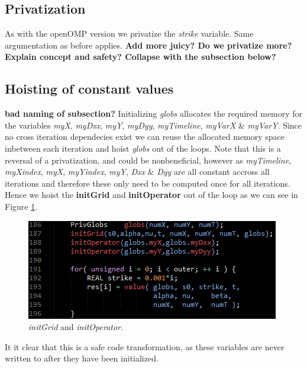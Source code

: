 \subsection{Privatization}
As with the openOMP version we privatize the \emph{strike} variable. Same
argumentation as before applies.
\textbf{Add more juicy? Do we privatize more? Explain concept and safety? Collapse with the subsection below?}

\subsection{Hoisting of constant values}
\textbf{bad naming of subsection?}
Initializing \emph{globs} allocates the required memory for the variables
\emph{myX}, \emph{myDxx}, \emph{myY}, \emph{myDyy}, \emph{myTimeline},
\emph{myVarX} \& \emph{myVarY}. Since no cross iteration dependecies exist we
can reuse the allocated memory space inbetween each iteration and hoist
\emph{globs} out of the loops. Note that this is a reversal of a privatization,
and could be nonbeneficial, however as \emph{myTimeline}, \emph{myXindex},
\emph{myX}, \emph{myYindex}, \emph{myY}, \emph{Dxx} \& \emph{Dyy} are all
constant accross all iterations and therefore these only need to be computed
once for all iterations. Hence we hoist the \textbf{initGrid} and
\textbf{initOperator} out of the loop as we can see in Figure
\ref{fig:globsinit}.

\begin{figure}[!ht]
\centering
\includegraphics[scale=1]{input/figures/globsinit.png}
\caption{\emph{initGrid} and \emph{initOperator}.\label{fig:globsinit}}
\end{figure}
 
It it clear that this is a safe code transformation, as these variables are
never written to after they have been initialized.

